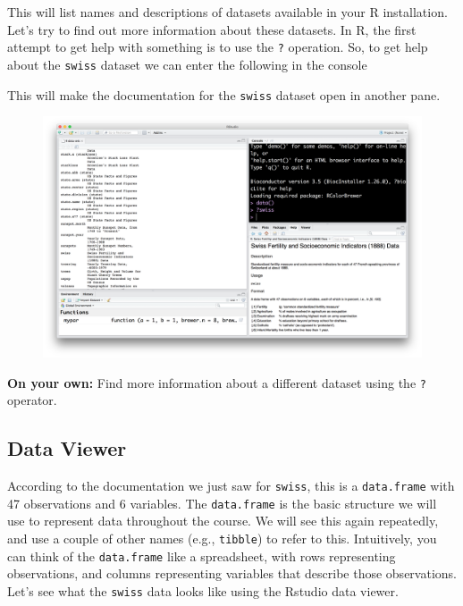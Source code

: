 \documentclass[12pt,]{book}
\theoremstyle{definition}
\theoremstyle{definition}
\theoremstyle{remark}
\begin{document}
This will list names and descriptions of datasets available in your R
installation. Let's try to find out more information about these
datasets. In R, the first attempt to get help with something is to use
the \texttt{?} operation. So, to get help about the \texttt{swiss}
dataset we can enter the following in the console

This will make the documentation for the \texttt{swiss} dataset open in
another pane.

\begin{figure}
\centering
\includegraphics{img/rstudio_swiss.png}
\caption{}
\end{figure}

\textbf{On your own:} Find more information about a different dataset
using the \texttt{?} operator.

\subsection{Data Viewer}\label{data-viewer}

According to the documentation we just saw for \texttt{swiss}, this is a
\texttt{data.frame} with 47 observations and 6 variables. The
\texttt{data.frame} is the basic structure we will use to represent data
throughout the course. We will see this again repeatedly, and use a
couple of other names (e.g., \texttt{tibble}) to refer to this.
Intuitively, you can think of the \texttt{data.frame} like a
spreadsheet, with rows representing observations, and columns
representing variables that describe those observations. Let's see what
the \texttt{swiss} data looks like using the Rstudio data viewer.
\end{document}
